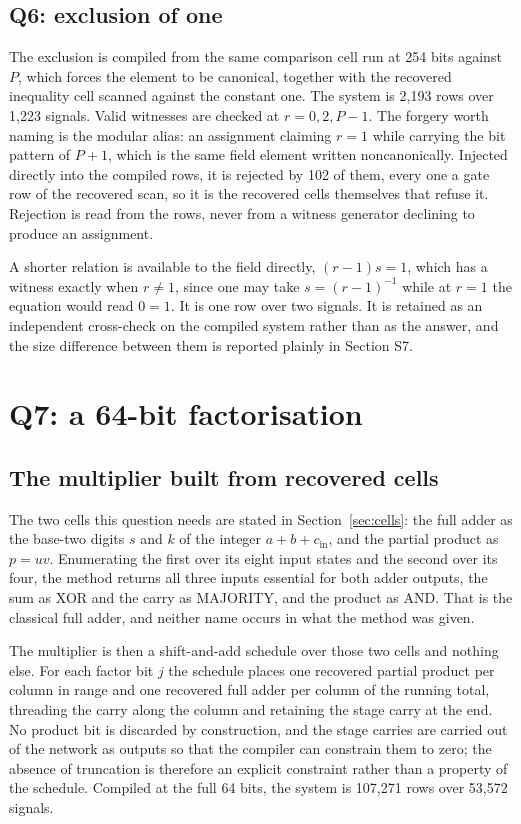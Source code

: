 \documentclass[11pt,a4paper]{article}
\begin{document}
\subsection{Q6: exclusion of one}
The exclusion is compiled from the same comparison cell run at 254 bits against
$P$, which forces the element to be canonical, together with the recovered
inequality cell scanned against the constant one. The system is 2{,}193 rows
over 1{,}223 signals. Valid witnesses are checked at $r=0,2,P-1$. The forgery
worth naming is the modular alias: an assignment claiming $r=1$ while carrying
the bit pattern of $P+1$, which is the same field element written
noncanonically. Injected directly into the compiled rows, it is rejected by 102
of them, every one a gate row of the recovered scan, so it is the recovered
cells themselves that refuse it. Rejection is read from the rows, never from a
witness generator declining to produce an assignment.

A shorter relation is available to the field directly, $(r-1)s=1$, which has a
witness exactly when $r\ne1$, since one may take $s=(r-1)^{-1}$ while at $r=1$
the equation would read $0=1$. It is one row over two signals. It is retained
as an independent cross-check on the compiled system rather than as the answer,
and the size difference between them is reported plainly in Section S7.

\section{Q7: a 64-bit factorisation}
\subsection{The multiplier built from recovered cells}
The two cells this question needs are stated in Section~\ref{sec:cells}: the
full adder as the base-two digits $s$ and $k$ of the integer
$a+b+c_{\mathrm{in}}$, and the partial product as $p=uv$. Enumerating the first
over its eight input states and the second over its four, the method returns all three inputs
essential for both adder outputs, the sum as XOR and the carry as MAJORITY,
and the product as AND. That is the classical full adder, and neither name
occurs in what the method was given.

The multiplier is then a shift-and-add schedule over those two cells and
nothing else. For each factor bit $j$ the schedule places one recovered partial
product per column in range and one recovered full adder per column of the
running total, threading the carry along the column and retaining the stage
carry at the end. No product bit is discarded by construction, and the stage
carries are carried out of the network as outputs so that the compiler can
constrain them to zero; the absence of truncation is therefore an explicit
constraint rather than a property of the schedule. Compiled at the full 64 bits,
the system is 107{,}271 rows over 53{,}572 signals.
\end{document}
